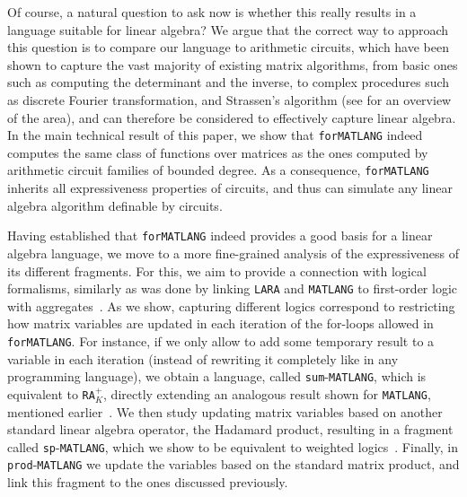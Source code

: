 \documentclass[sigconf]{acmart}
\newcommand{\rak}{\texttt{RA}$_K^+$\xspace}
\newcommand{\lara}{\texttt{LARA}\xspace}
\newcommand{\lang}{\texttt{MATLANG}\xspace}
\newcommand{\langfor}{\texttt{for}\text{-}\texttt{MATLANG}\xspace}
\newcommand{\langsum}{\texttt{sum}-\texttt{MATLANG}\xspace}
\newcommand{\langprod}{\texttt{sp}-\texttt{MATLANG}\xspace}
\newcommand{\langmprod}{\texttt{prod}-\texttt{MATLANG}\xspace}
\begin{document}
Of course, a natural question to ask now is whether this really results in a language suitable for linear algebra? We argue that the correct way to approach this question is to compare our language to arithmetic circuits, which have been shown to capture the vast majority of existing matrix algorithms, from basic ones such as computing the determinant and the inverse, to complex procedures such as discrete Fourier transformation, and Strassen's algorithm (see \cite{ShpilkaY10,allender} for an overview of the area), and can therefore be considered to effectively capture linear algebra. In the main technical result of this paper, we show that \langfor indeed computes the same class of functions over matrices as the ones computed by arithmetic circuit families of bounded degree.  As a consequence, \langfor inherits all expressiveness properties of circuits, and thus can simulate any linear algebra algorithm definable by circuits.

Having established that \langfor indeed provides a good basis for a linear algebra language, we move to a more fine-grained analysis of the expressiveness of its different fragments. For this, we aim to provide a connection with logical formalisms, similarly as was done by linking \lara and \lang to first-order logic with aggregates~\cite{BarceloH0S20,matlang-journal}. As we show, capturing different logics correspond to restricting how matrix variables are updated in each iteration of the for-loops allowed in \langfor. For instance, if we only allow to add some temporary result to a variable in each iteration (instead of rewriting it completely like in any programming language), we obtain a language, called \langsum, which is equivalent to \rak, directly extending an analogous result shown for \lang, mentioned earlier~\cite{brijder2019matrices}. We then study updating matrix variables based on another standard linear algebra operator, the Hadamard product, resulting in a fragment called \langprod, which we show to be equivalent to weighted logics~\cite{DrosteG05}. Finally, in \langmprod 
we update the variables based on the standard matrix product, and link this fragment 
to the ones discussed previously.  
\end{document}

